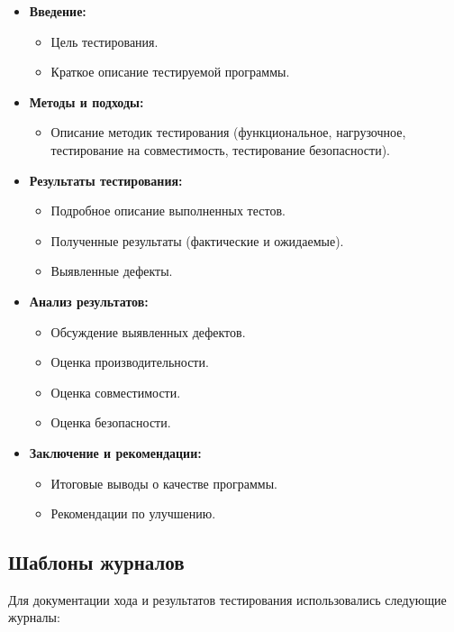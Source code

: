 \documentclass{article}
\begin{document}
    \begin{itemize}
        \item \textbf{Введение:}
        \begin{itemize}
            \item Цель тестирования.
            \item Краткое описание тестируемой программы.
        \end{itemize}
        \item \textbf{Методы и подходы:}
        \begin{itemize}
            \item Описание методик тестирования (функциональное, нагрузочное, тестирование на совместимость, тестирование безопасности).
        \end{itemize}
        \item \textbf{Результаты тестирования:}
        \begin{itemize}
            \item Подробное описание выполненных тестов.
            \item Полученные результаты (фактические и ожидаемые).
            \item Выявленные дефекты.
        \end{itemize}
        \item \textbf{Анализ результатов:}
        \begin{itemize}
            \item Обсуждение выявленных дефектов.
            \item Оценка производительности.
            \item Оценка совместимости.
            \item Оценка безопасности.
        \end{itemize}
        \item \textbf{Заключение и рекомендации:}
        \begin{itemize}
            \item Итоговые выводы о качестве программы.
            \item Рекомендации по улучшению.
        \end{itemize}
    \end{itemize}

    \subsection{Шаблоны журналов}

    Для документации хода и результатов тестирования использовались следующие журналы:
\end{document}
